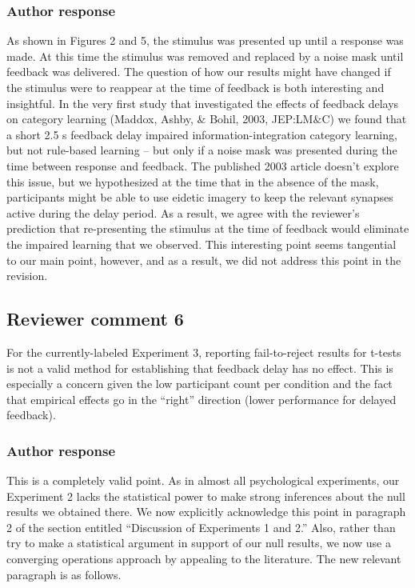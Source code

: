 \documentclass[12pt]{article}
\begin{document}
\subsubsection{Author response}
As shown in Figures 2 and 5, the stimulus was presented up
until a response was made. At this time the stimulus was
removed and replaced by a noise mask until feedback was
delivered. The question of how our results might have
changed if the stimulus were to reappear at the time of
feedback is both interesting and insightful. In the very
first study that investigated the effects of feedback delays
on category learning (Maddox, Ashby, \& Bohil, 2003,
JEP:LM$\&$C) we found that a short 2.5 s feedback delay
impaired information-integration category learning, but not
rule-based learning -- but only if a noise mask was
presented during the time between response and feedback. The
published 2003 article doesn't explore this issue, but we
hypothesized at the time that in the absence of the mask,
participants might be able to use eidetic imagery to keep
the relevant synapses active during the delay period. As a
result, we agree with the reviewer's prediction that
re-presenting the stimulus at the time of feedback would
eliminate the impaired learning that we observed. This
interesting point seems tangential to our main point,
however, and as a result, we did not address this point in
the revision.               

\subsection{Reviewer comment 6}
For the currently-labeled Experiment 3, reporting
fail-to-reject results for t-tests is not a valid method for
establishing that feedback delay has no effect. This is
especially a concern given the low participant count per
condition and the fact that empirical effects go in the
``right'' direction (lower performance for delayed
feedback).

\subsubsection{Author response}
This is a completely valid point. As in almost all
psychological experiments, our Experiment 2 lacks the
statistical power to make strong inferences about the null
results we obtained there. We now explicitly acknowledge
this point in paragraph 2 of the section entitled
``Discussion of Experiments 1 and 2.'' Also, rather than try
to make a statistical argument in support of our null
results, we now use a converging operations approach by
appealing to the literature. The new relevant paragraph is
as follows.
\end{document}
